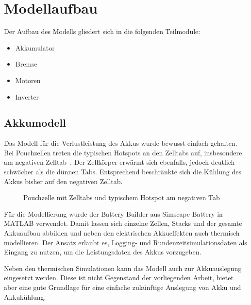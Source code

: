 \section{Modellaufbau}
\label{sec:modellaufbau}

Der Aufbau des Modells gliedert sich in die folgenden Teilmodule:

\begin{itemize}
    \item Akkumulator
    \item Bremse
    \item Motoren
    \item Inverter
\end{itemize}


\subsection{Akkumodell}
\label{subsec:akkumodell}

Das Modell für die Verlustleistung des Akkus wurde bewusst einfach gehalten.
Bei Pouchzellen treten die typischen Hotspots an den Zelltabs auf, insbesondere
am negativen Zelltab~\cite{TODO_Quelle}. Der Zellkörper erwärmt sich ebenfalls,
jedoch deutlich schwächer als die dünnen Tabs. Entsprechend beschränkte sich die
Kühlung des Akkus bisher auf den negativen Zelltab.

\begin{figure}[htbp]
    \centering
    \caption{Pouchzelle mit Zelltabs und typischem Hotspot am negativen Tab}
    \label{fig:pouchzelle_hotspots}
\end{figure}

Für die Modellierung wurde der Battery Builder aus Simscape Battery in MATLAB
verwendet. Damit lassen sich einzelne Zellen, Stacks und der gesamte Akkuaufbau
abbilden und neben den elektrischen Akkueffekten auch thermisch modellieren.
Der Ansatz erlaubt es, Logging- und Rundenzeitsimulationsdaten als Eingang zu
nutzen, um die Leistungsdaten des Akkus vorzugeben.

Neben den thermischen Simulationen kann das Modell auch zur Akkuauslegung
eingesetzt werden. Diese ist nicht Gegenstand der vorliegenden Arbeit, bietet
aber eine gute Grundlage für eine einfache zukünftige Auslegung von Akku und
Akkukühlung.

